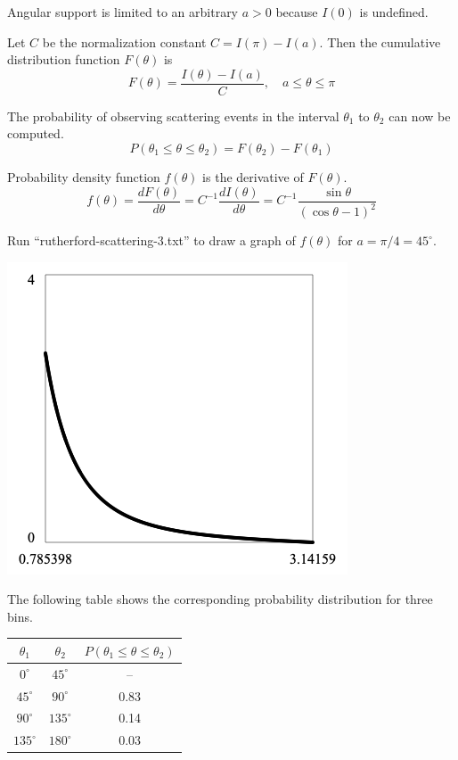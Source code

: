 \documentclass[12pt]{article}
\begin{document}
\noindent
Angular support is limited to an arbitrary $a>0$ because $I(0)$ is undefined.

\bigskip
\noindent
Let $C$ be the normalization constant $C=I(\pi)-I(a)$.
Then the cumulative distribution function $F(\theta)$ is
\begin{equation*}
F(\theta)=\frac{I(\theta)-I(a)}{C},
\quad a\le\theta\le\pi
\end{equation*}

\noindent
The probability of observing scattering events
in the interval $\theta_1$ to $\theta_2$ can now be computed.
\begin{equation*}
P(\theta_1\le\theta\le\theta_2)=F(\theta_2)-F(\theta_1)
\end{equation*}

\noindent
Probability density function $f(\theta)$ is the derivative of $F(\theta)$.
\begin{equation*}
f(\theta)=\frac{dF(\theta)}{d\theta}=C^{-1}\frac{dI(\theta)}{d\theta}
=C^{-1}\frac{\sin\theta}{(\cos\theta-1)^2}
\end{equation*}

\noindent
Run ``rutherford-scattering-3.txt'' to draw a graph of $f(\theta)$ for $a=\pi/4=45^\circ$.

\begin{center}
\includegraphics[scale=0.5]{rutherford-scattering-1.png}
\end{center}

\noindent
The following table shows the corresponding probability distribution for three bins.

\begin{center}
\begin{tabular}{|c|c|c|}
\hline
$\theta_1$ & $\theta_2$ & $P(\theta_1\le\theta\le\theta_2)$\\
\hline
$0^\circ$ & $45^\circ$ & -- \\
$45^\circ$ & $90^\circ$ & 0.83 \\
$90^\circ$ & $135^\circ$ & 0.14 \\
$135^\circ$ & $180^\circ$ & 0.03 \\
\hline
\end{tabular}
\end{center}
\end{document}
